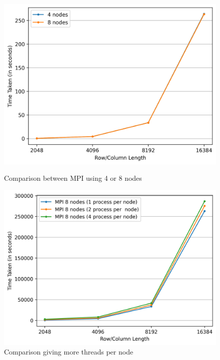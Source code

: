 \begin{figure}[h!]
    \centering
    \begin{minipage}[t]{0.49\textwidth}
        \centering
         \includegraphics[width=\textwidth]{img/MPI/mpi_strong_scaling.png}
        \caption{Comparison between MPI using 4 or 8 nodes}
        \label{MPI_4_8_NODES}
    \end{minipage}
    \hfill
    \begin{minipage}[t]{0.49\textwidth}
        \centering
        \includegraphics[width=\textwidth]{img/MPI/mpi_threads.png}
        \caption{Comparison giving more threads per node}
        \label{MPI_THEADS}
    \end{minipage}
    

\end{figure}
